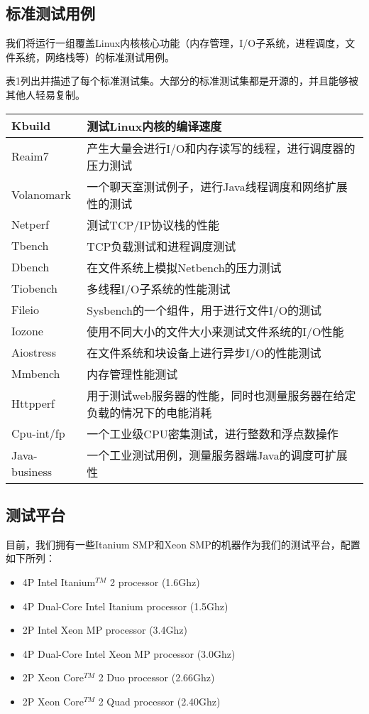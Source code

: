 \subsection{标准测试用例}
我们将运行一组覆盖Linux内核核心功能（内存管理，I/O子系统，进程调度，文件系统，网络栈等）的标准测试用例。

表1列出并描述了每个标准测试集。大部分的标准测试集都是开源的，并且能够被其他人轻易复制。



\tabletail{\hline}

\begin{supertabular}{|p{2.5cm}|p{10.3cm}|}
\hline
Kbuild & 测试Linux内核的编译速度\\
\hline
Reaim7 & 产生大量会进行I/O和内存读写的线程，进行调度器的压力测试\\
\hline
Volanomark & 一个聊天室测试例子，进行Java线程调度和网络扩展性的测试\\
\hline 
Netperf & 测试TCP/IP协议栈的性能\\
\hline
Tbench & TCP负载测试和进程调度测试\\
\hline
Dbench & 在文件系统上模拟Netbench的压力测试\\
\hline
Tiobench & 多线程I/O子系统的性能测试\\
\hline
Fileio & Sysbench的一个组件，用于进行文件I/O的测试\\
\hline
Iozone & 使用不同大小的文件大小来测试文件系统的I/O性能\\
\hline
Aiostress & 在文件系统和块设备上进行异步I/O的性能测试\\
\hline
Mmbench & 内存管理性能测试\\
\hline
Httpperf & 用于测试web服务器的性能，同时也测量服务器在给定负载的情况下的电能消耗\\
\hline
Cpu-int/fp & 一个工业级CPU密集测试，进行整数和浮点数操作\\
\hline
Java-business & 一个工业测试用例，测量服务器端Java的调度可扩展性\\
\end{supertabular}


\subsection{测试平台}
目前，我们拥有一些Itanium SMP和Xeon SMP的机器作为我们的测试平台，配置如下所列：

\begin{itemize}
\item 4P Intel Itanium$^{TM}$ 2 processor (1.6Ghz)
\item 4P Dual-Core Intel Itanium processor (1.5Ghz) 
\item 2P Intel Xeon MP processor (3.4Ghz)
\item 4P Dual-Core Intel Xeon MP processor (3.0Ghz) 
\item 2P Xeon Core$^{TM}$ 2 Duo processor (2.66Ghz)
\item 2P Xeon Core$^{TM}$ 2 Quad processor (2.40Ghz)
\end{itemize}
